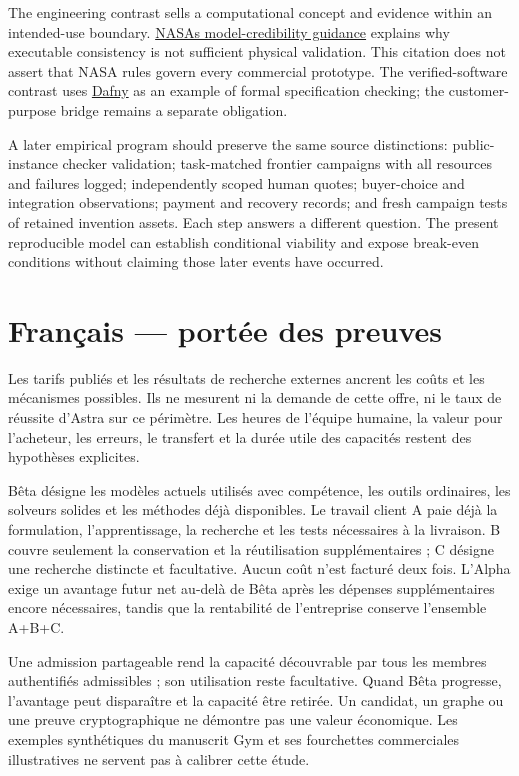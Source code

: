 \documentclass[
  10pt,
]{article}
\let\studysection\section
\renewcommand{\section}{\Needspace{7\baselineskip}\studysection}
\begin{document}
The engineering contrast sells a computational concept and evidence
within an intended-use boundary.
\href{https://public.ksc.nasa.gov/mns/faq/}{NASA\textquotesingle s
model-credibility guidance} explains why executable consistency is not
sufficient physical validation. This citation does not assert that NASA
rules govern every commercial prototype. The verified-software contrast
uses \href{https://dafny.org/}{Dafny} as an example of formal
specification checking; the customer-purpose bridge remains a separate
obligation.

A later empirical program should preserve the same source distinctions:
public-instance checker validation; task-matched frontier campaigns with
all resources and failures logged; independently scoped human quotes;
buyer-choice and integration observations; payment and recovery records;
and fresh campaign tests of retained invention assets. Each step answers
a different question. The present reproducible model can establish
conditional viability and expose break-even conditions without claiming
those later events have occurred.

\hypertarget{franuxe7ais--portuxe9e-des-preuves}{%
\section{Français --- portée des
preuves}\label{franuxe7ais--portuxe9e-des-preuves}}

Les tarifs publiés et les résultats de recherche externes ancrent les
coûts et les mécanismes possibles. Ils ne mesurent ni la demande de
cette offre, ni le taux de réussite d'Astra sur ce périmètre. Les heures
de l'équipe humaine, la valeur pour l'acheteur, les erreurs, le
transfert et la durée utile des capacités restent des hypothèses
explicites.

Bêta désigne les modèles actuels utilisés avec compétence, les outils
ordinaires, les solveurs solides et les méthodes déjà disponibles. Le
travail client A paie déjà la formulation, l'apprentissage, la recherche
et les tests nécessaires à la livraison. B couvre seulement la
conservation et la réutilisation supplémentaires ; C désigne une
recherche distincte et facultative. Aucun coût n'est facturé deux fois.
L'Alpha exige un avantage futur net au-delà de Bêta après les dépenses
supplémentaires encore nécessaires, tandis que la rentabilité de
l'entreprise conserve l'ensemble A+B+C.

Une admission partageable rend la capacité découvrable par tous les
membres authentifiés admissibles ; son utilisation reste facultative.
Quand Bêta progresse, l'avantage peut disparaître et la capacité être
retirée. Un candidat, un graphe ou une preuve cryptographique ne
démontre pas une valeur économique. Les exemples synthétiques du
manuscrit Gym et ses fourchettes commerciales illustratives ne servent
pas à calibrer cette étude.
\end{document}
